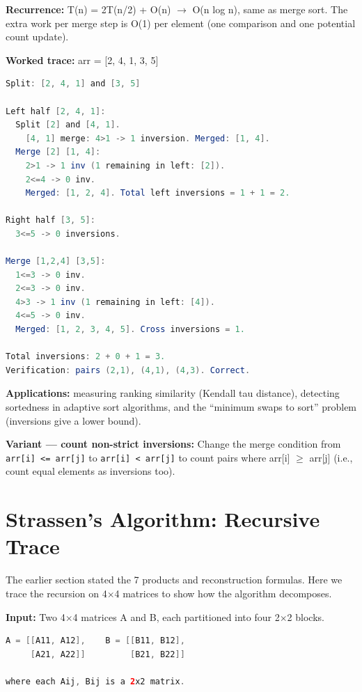\textbf{Recurrence:} T(n) = 2T(n/2) + O(n) $\to$ O(n log n), same as merge sort. The extra work per merge step is O(1) per element (one comparison and one potential count update).

\textbf{Worked trace:} arr = [2, 4, 1, 3, 5]

\begin{lstlisting}[language=Java]
Split: [2, 4, 1] and [3, 5]

Left half [2, 4, 1]:
  Split [2] and [4, 1].
    [4, 1] merge: 4>1 -> 1 inversion. Merged: [1, 4].
  Merge [2] [1, 4]:
    2>1 -> 1 inv (1 remaining in left: [2]).
    2<=4 -> 0 inv.
    Merged: [1, 2, 4]. Total left inversions = 1 + 1 = 2.

Right half [3, 5]:
  3<=5 -> 0 inversions.

Merge [1,2,4] [3,5]:
  1<=3 -> 0 inv.
  2<=3 -> 0 inv.
  4>3 -> 1 inv (1 remaining in left: [4]).
  4<=5 -> 0 inv.
  Merged: [1, 2, 3, 4, 5]. Cross inversions = 1.

Total inversions: 2 + 0 + 1 = 3.
Verification: pairs (2,1), (4,1), (4,3). Correct.
\end{lstlisting}

\textbf{Applications:} measuring ranking similarity (Kendall tau distance), detecting sortedness in adaptive sort algorithms, and the ``minimum swaps to sort'' problem (inversions give a lower bound).

\textbf{Variant --- count non-strict inversions:} Change the merge condition from \texttt{arr[i] <= arr[j]} to \texttt{arr[i] < arr[j]} to count pairs where arr[i] $\ge$ arr[j] (i.e., count equal elements as inversions too).

\section{Strassen's Algorithm: Recursive Trace}

The earlier section stated the 7 products and reconstruction formulas. Here we trace the recursion on 4$\times$4 matrices to show how the algorithm decomposes.

\textbf{Input:} Two 4$\times$4 matrices A and B, each partitioned into four 2$\times$2 blocks.

\begin{lstlisting}[language=Java]
A = [[A11, A12],    B = [[B11, B12],
     [A21, A22]]         [B21, B22]]

where each Aij, Bij is a 2x2 matrix.
\end{lstlisting}

